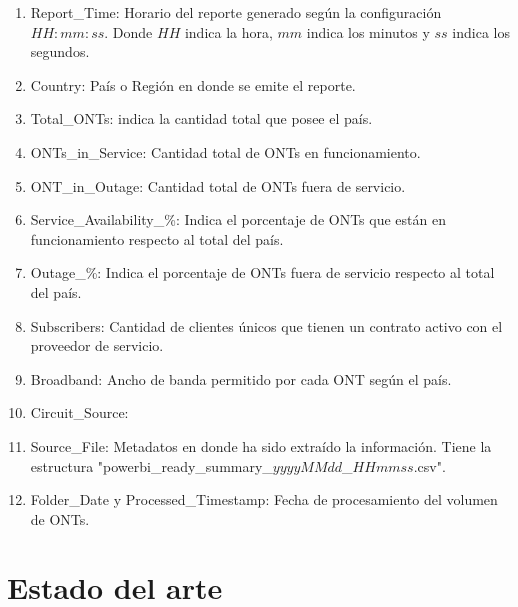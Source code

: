 \documentclass[12pt,a4paper]{article}
\begin{document}
\begin{itemize}
\begin{enumerate}
        \item Report\_Time: Horario del reporte generado según la configuración $HH:mm:ss$. Donde $HH$ indica la hora, $mm$ indica los minutos y $ss$ indica los segundos.
        \item Country: País o Región en donde se emite el reporte.
        \item Total\_ONTs: indica la cantidad total que posee el país.
        \item ONTs\_in\_Service: Cantidad total de ONTs en funcionamiento.
        \item ONT\_in\_Outage: Cantidad total de ONTs fuera de servicio. 
        \item Service\_Availability\_\%: Indica el porcentaje de ONTs que están en funcionamiento respecto al total del país.
        \item Outage\_\%: Indica el porcentaje de ONTs fuera de servicio respecto al total del país.
        \item Subscribers: Cantidad de clientes únicos que tienen un contrato activo con el proveedor de servicio.
        \item Broadband: Ancho de banda permitido por cada ONT según el país.
        \item Circuit\_Source: %
        \item Source\_File: Metadatos en donde ha sido extraído la información. Tiene la estructura "powerbi\_ready\_summary\_$yyyyMMdd$\_$HHmmss$.csv".   
        \item Folder\_Date y Processed\_Timestamp: Fecha de procesamiento del volumen de ONTs.
    \end{enumerate}


    \section*{Estado del arte}




\end{itemize}
\end{document}
